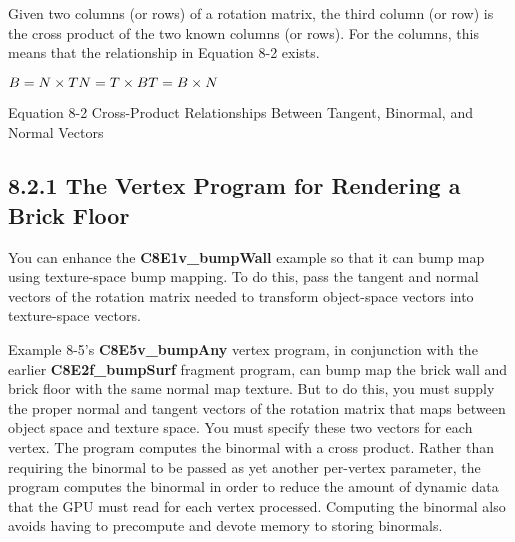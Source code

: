 \documentclass[../main.tex]{subfiles}
\begin{document}
Given two columns (or rows) of a rotation matrix, the third column (or row) is the cross product of the two known columns (or rows). For the columns, this means that the relationship in Equation 8-2 exists.

\FloatBarrier
\begin{equationcaption}
$
B = N \times T \newline
N = T \times B \newline
T = B \times N \newline
$
\caption{Equation 8-2 Cross-Product Relationships Between Tangent, Binormal, and Normal Vectors}
\end{equationcaption}
\FloatBarrier

\subsection{8.2.1 The Vertex Program for Rendering a Brick Floor}

You can enhance the \textbf{C8E1v_bumpWall} example so that it can bump map using texture-space bump mapping. To do this, pass the tangent and normal vectors of the rotation matrix needed to transform object-space vectors into texture-space vectors.

Example 8-5's \textbf{C8E5v_bumpAny} vertex program, in conjunction with the earlier \textbf{C8E2f_bumpSurf} fragment program, can bump map the brick wall and brick floor with the same normal map texture. But to do this, you must supply the proper normal and tangent vectors of the rotation matrix that maps between object space and texture space. You must specify these two vectors for each vertex. The program computes the binormal with a cross product. Rather than requiring the binormal to be passed as yet another per-vertex parameter, the program computes the binormal in order to reduce the amount of dynamic data that the GPU must read for each vertex processed. Computing the binormal also avoids having to precompute and devote memory to storing binormals.
\end{document}

